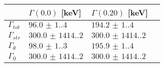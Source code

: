 \begin{tabular}{llll} \hline
\toprule 
 & $\Gamma(0.0)$ [keV]  &  $\Gamma(0.20)$ [keV]  \\ \midrule 
$\Gamma_{tot}$ & $\num{96.0(1.4)}$ & $\num{194.2(1.4)}$\\ 
$\Gamma_{str}$ & $\num{300.0(1414.2)}$ & $\num{300.0(1414.2)}$\\ 
$\Gamma_{\theta}$ & $\num{98.0(1.3)}$ & $\num{195.9(1.4)}$\\ 
$\Gamma_{0}$ & $\num{300.0(1414.2)}$ & $\num{300.0(1414.2)}$\\ 
 \bottomrule 
\end{tabular}
